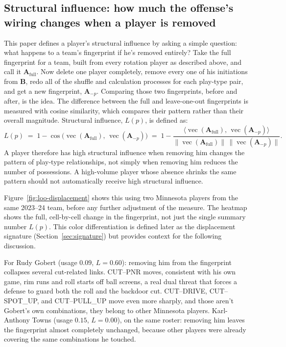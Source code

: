 \documentclass[11pt]{article}
\newcommand{\Bmat}{\ensuremath{\bm{B}}} %
\newcommand{\Amat}{\ensuremath{\bm{A}}} %
\newcommand{\Afull}{\ensuremath{\Amat_{\text{full}}}}
\newcommand{\Aminus}[1]{\ensuremath{\Amat_{-#1}}}
\newcommand{\load}{\ensuremath{L}} %
\newcommand{\cossim}{\operatorname{cos}}
\begin{document}
\subsection{Structural influence: how much the offense's wiring changes when a player is removed}
\label{sec:load}

This paper defines a player's structural influence by asking a simple question: what happens
to a team's fingerprint if he's removed entirely?
Take the full fingerprint for a team, built from every rotation player as described above,
and call it $\Afull$. Now delete one player completely, remove every one of his initiations
from $\Bmat$, redo all of the shuffle and calculation processes for each play-type pair, and
get a new fingerprint, $\Aminus{p}$. Comparing those two fingerprints, before and after, is
the idea.
The difference between the full and leave-one-out fingerprints is measured with cosine
similarity, which compares their pattern rather than their overall magnitude. Structural
influence, $\load(p)$, is defined as:
\begin{equation}
\label{eq:load}
\load(p) \;=\; 1-\cossim\!\big(\operatorname{vec}(\Afull),\,\operatorname{vec}(\Aminus{p})\big)
\;=\; 1-\frac{\langle \operatorname{vec}(\Afull),\,\operatorname{vec}(\Aminus{p})\rangle}
{\lVert\operatorname{vec}(\Afull)\rVert\,\lVert\operatorname{vec}(\Aminus{p})\rVert}.
\end{equation}
A player therefore has high structural influence when removing him changes the pattern of
play-type relationships, not simply when removing him reduces the number of possessions. A
high-volume player whose absence shrinks the same pattern should not automatically receive
high structural influence.

Figure~\ref{fig:loo-displacement} shows this using two Minnesota players from the same
2023--24 team, before any further adjustment of the measure. The heatmap shows the full,
cell-by-cell change in the fingerprint, not just the single summary number $\load(p)$. This
color differentiation is defined later as the displacement signature
(Section~\ref{sec:signature}) but provides context for the following discussion.

For Rudy Gobert (usage $0.09$, $\load=0.60$): removing him from the fingerprint collapses
several cut-related links. CUT--PNR moves, consistent with his own game, rim runs and roll
starts off ball screens, a real dual threat that forces a defense to guard both the roll and
the backdoor cut. CUT--DRIVE, CUT--SPOT\_UP, and CUT--PULL\_UP move even more sharply, and
those aren't Gobert's own combinations, they belong to other Minnesota players.
Karl-Anthony Towns (usage $0.15$, $\load=0.00$), on the same roster: removing him leaves the
fingerprint almost completely unchanged, because other players were already covering the same
combinations he touched.
\end{document}
